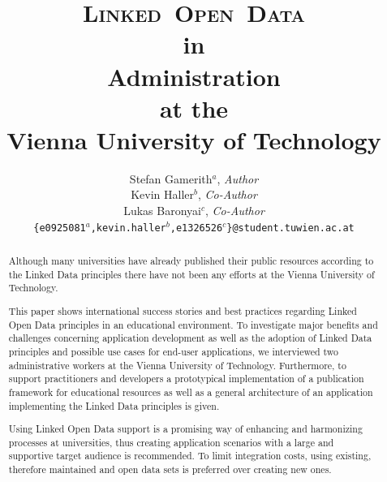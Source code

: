 \documentclass{article}
\begin{document}
\renewcommand{\bibname}{References}

\pagestyle{plain}

\title{\textsc{\textbf{L}inked~\textbf{O}pen~\textbf{D}ata}\\in\\Administration\\at the\\Vienna University of Technology}
\date{}
\author{Stefan Gamerith$^a$, \textit{Author}\\
Kevin Haller$^b$, \textit{Co-Author}\\
Lukas Baronyai$^c$, \textit{Co-Author}\\
\texttt{\{e0925081$^a$,kevin.haller$^b$,e1326526$^c$\}@student.tuwien.ac.at}}

\maketitle
\thispagestyle{empty}

\begin{abstract}
Although many universities have already published their public resources according to the Linked Data principles there 
have not been any efforts at the Vienna University of Technology.

This paper shows international success stories and best practices 
regarding Linked Open Data principles in an educational environment. To investigate major benefits and challenges concerning application 
development as well as the adoption of Linked Data principles and possible use cases for end-user applications, we interviewed two 
administrative workers at the Vienna University of Technology. Furthermore, to support practitioners and developers a prototypical 
implementation of a publication framework for educational resources as well as a general architecture of an application implementing the Linked Data principles
is given. 

Using Linked Open Data support is a promising way of enhancing and harmonizing processes at universities, thus creating application scenarios with a large and supportive target audience is recommended. To limit integration costs, using existing, therefore maintained and open data sets is preferred over creating new ones. 


\end{abstract}

\newpage
\tableofcontents
\thispagestyle{empty}

\newpage
{}
\end{document}
